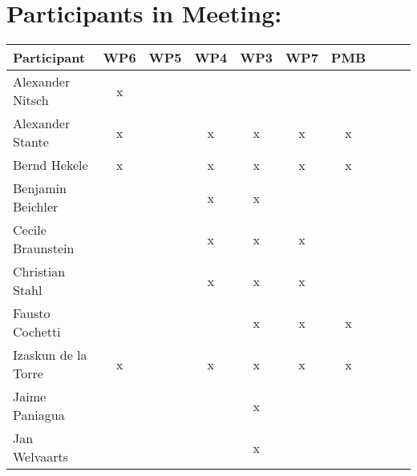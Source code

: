 \documentclass[a4paper, 11pt]{article}
\begin{document}
\section{Participants in Meeting:}

\begin{tabular}{|l|c|c|c||c|c|c||c|c|c|}
\hline
\textbf{Participant} & \textbf{WP6} &  \textbf{WP5} & \textbf{WP4}&  \textbf{WP3} & \textbf{WP7}&  \textbf{PMB} \\\hline
Alexander Nitsch     & x &   &   &   &   &   \\\hline  
Alexander Stante     & x &   & x & x & x & x \\\hline 
Bernd Hekele         & x &   & x & x & x & x \\\hline
Benjamin Beichler    &   &   & x & x &   &   \\\hline
Cecile Braunstein    &   &   & x & x & x &   \\\hline
Christian Stahl      &   &   & x & x & x &   \\\hline
Fausto Cochetti      &   &   &   & x & x & x \\\hline
Izaskun de la Torre  & x &   & x & x & x & x \\\hline
Jaime Paniagua       &   &   &   & x &   &   \\\hline
Jan Welvaarts        &   &   &   & x &   &   \\\hline

\end{tabular}
\end{document}
